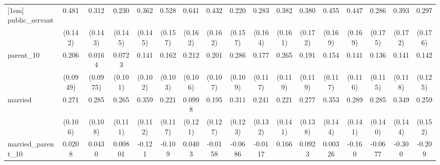 {\begin{tabular}{l*{16}{c}}
[1em]
public\_servant      &       0.481\sym{***}&       0.312\sym{*}  &       0.230         &       0.362\sym{*}  &       0.528\sym{***}&       0.641\sym{***}&       0.432\sym{**} &       0.220         &       0.283         &       0.382\sym{*}  &       0.380\sym{*}  &       0.455\sym{**} &       0.447\sym{**} &       0.286         &       0.393\sym{*}  &       0.297         \\
                    &     (0.142)         &     (0.143)         &     (0.145)         &     (0.145)         &     (0.157)         &     (0.162)         &     (0.162)         &     (0.157)         &     (0.164)         &     (0.161)         &     (0.172)         &     (0.169)         &     (0.169)         &     (0.175)         &     (0.172)         &     (0.176)         \\
[1em]
parent\_10           &       0.206\sym{*}  &      0.0164         &      0.0723         &       0.141         &       0.162         &       0.212\sym{*}  &       0.201         &       0.286\sym{**} &       0.177         &       0.265\sym{*}  &       0.191         &       0.154         &       0.141         &       0.136         &       0.141         &       0.142         \\
                    &    (0.0949)         &    (0.0975)         &     (0.101)         &     (0.102)         &     (0.103)         &     (0.106)         &     (0.107)         &     (0.109)         &     (0.117)         &     (0.119)         &     (0.119)         &     (0.117)         &     (0.116)         &     (0.115)         &     (0.118)         &     (0.125)         \\
[1em]
married             &       0.271\sym{*}  &       0.285\sym{**} &       0.265\sym{*}  &       0.359\sym{**} &       0.221         &      0.0998         &       0.195         &       0.311\sym{*}  &       0.241         &       0.221         &       0.277\sym{*}  &       0.353\sym{*}  &       0.289\sym{*}  &       0.285\sym{*}  &       0.349\sym{*}  &       0.259         \\
                    &     (0.106)         &     (0.108)         &     (0.111)         &     (0.112)         &     (0.117)         &     (0.121)         &     (0.127)         &     (0.123)         &     (0.132)         &     (0.141)         &     (0.138)         &     (0.144)         &     (0.141)         &     (0.140)         &     (0.144)         &     (0.152)         \\
[1em]
married\_parent\_10   &      0.0208         &      0.0430         &     0.00801         &      -0.121         &      -0.109         &      0.0403         &     -0.0158         &     -0.0686         &     -0.0117         &       0.166         &      0.0923         &     0.00326         &      -0.160         &     -0.0677         &      -0.300         &      -0.209         \\

\end{tabular}}
